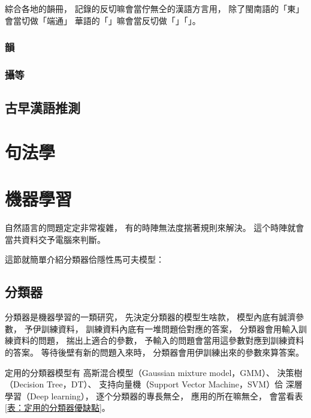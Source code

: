 綜合各地的韻冊，
記錄的反切嘛會當佇無仝的漢語方言用，
除了閩南語的「東」會當切做「端通」
華語的「」嘛會當反切做「」「」。

\subsubsection{韻}
\label{小節：韻}




\subsubsection{攝等}
\label{小節：攝等}


\subsection{古早漢語推測}
\label{小節：古早漢語推測}

%

\section{句法學}
\label{節：句法學}
%


\section{機器學習}
\label{節：機器學習}
自然語言的問題定定非常複雜，
有的時陣無法度揣著規則來解決。
這个時陣就會當共資料交予電腦來判斷。

這節就簡單介紹分類器佮隱性馬可夫模型：

\subsection{分類器}
\label{小節：分類器}
分類器是機器學習的一類研究，
先決定分類器的模型生啥款，
模型內底有誠濟參數，
予伊訓練資料，
訓練資料內底有一堆問題佮對應的答案，
分類器會用輸入訓練資料的問題，
揣出上適合的參數， 
予輸入的問題會當用這參數對應到訓練資料的答案。
等待後壁有新的問題入來時，
分類器會用伊訓練出來的參數來算答案。

定用的分類器模型有
高斯混合模型（Gaussian mixture model，GMM）、
決策樹（Decision Tree，DT）、
支持向量機（Support Vector Machine，SVM）佮
深層學習（Deep learning），
逐个分類器的專長無仝，
應用的所在嘛無仝，
會當看表\ref{表：定用的分類器優缺點}。

